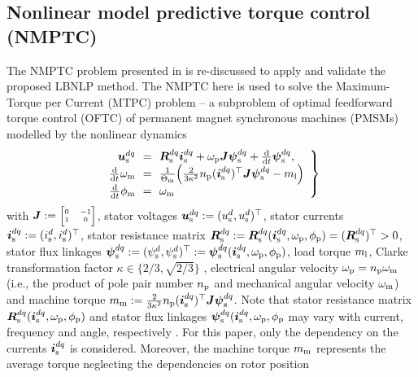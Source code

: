 \documentclass[journal]{IEEEtranTIE}
\begin{document}
\subsection{Nonlinear model predictive torque control (NMPTC)}
\label{subsec:NMPTC}

The NMPTC problem presented in \cite{choi2023model} is re-discussed to apply and validate the proposed LBNLP method. The NMPTC here is used to solve the Maximum-Torque per Current (MTPC) problem -- a subproblem of optimal feedforward torque control (OFTC) \cite{2017_Eldeeb_Aunifiedtheoryforoptimalfeedforwardtorquecontrolofanisotropicsynchronousmachines} of permanent magnet synchronous machines (PMSMs) modelled by the nonlinear dynamics
% 
\begin{equation}
	\left.
	\begin{array}{rcl}
		\usdq &\!\!=\!\!& \Rsdq\isdq + \omegaP\J\psisdq+\ddt\psisdq,  \\
        \ddtsmall \omegaM &\!\!=\!\!& \tfrac{1}{\ThetaM}\Big( \tfrac{2}{3\kappa^2}\nP (\isdq)^\top\J \psisdq - \mL \Big) \\
        \ddtsmall \phiM &\!\!=\!\!& \omegaM
	\end{array}
	\right\}
	\label{eq:transformer-like FLDM}
\end{equation}
% 
with
$\J:={\tiny\begin{bmatrix}
	0 & -1 \\ 1 & 0
\end{bmatrix}}$, 
stator voltages $\boldsymbol{u}_{\mathrm{s}}^{dq}:=(u_{\mathrm{s}}^{d},u_{\mathrm{s}}^{d})^\top$, 
stator currents  $\boldsymbol{i}_{\mathrm{s}}^{dq}:=(i_{\mathrm{s}}^{d},i_{\mathrm{s}}^{d})^\top$,  
stator resistance matrix $\boldsymbol{R}_{\mathrm{s}}^{dq}:=\boldsymbol{R}_{\mathrm{s}}^{dq}(\boldsymbol{i}_{\mathrm{s}}^{dq},\omega_{\mathrm{p}},\phi_{\mathrm{p}}) = (\boldsymbol{R}_{\mathrm{s}}^{dq})^\top >0$,
stator flux linkages $\boldsymbol{\psi}_{\mathrm{s}}^{dq}:=(\psi_{\mathrm{s}}^{d},\psi_{\mathrm{s}}^{d})^\top:=\boldsymbol{\psi}_{\mathrm{s}}^{dq}(\boldsymbol{i}_{\mathrm{s}}^{dq},\omega_{\mathrm{p}},\phi_{\mathrm{p}})$,  
load torque $m_{\mathrm{l}}$,
Clarke transformation factor $\kappa \in \{2/3, \sqrt{2/3}\}$ \cite[Ch.~14]{2017_Hackl_Non-identifierbasedadaptivecontrolinmechatronics:TheoryandApplication},
electrical angular velocity $\omega_{\mathrm{p}} = n_{\mathrm{p}}\omega_{\mathrm{m}}$ (i.e., the product of pole pair number $n_{\mathrm{p}}$ and  mechanical angular velocity $\omega_{\mathrm{m}}$) and machine torque $m_{\mathrm{m}}:=\tfrac{2}{3\kappa^2}n_{\mathrm{p}} (\boldsymbol{i}_{\mathrm{s}}^{dq})^\top\boldsymbol{J} \boldsymbol{\psi}_{\mathrm{s}}^{dq}$.
Note that stator resistance matrix $\boldsymbol{R}_{\mathrm{s}}^{dq}(\boldsymbol{i}_{\mathrm{s}}^{dq},\omega_{\mathrm{p}},\phi_{\mathrm{p}})$ and stator flux linkages $\boldsymbol{\psi}_{\mathrm{s}}^{dq}(\boldsymbol{i}_{\mathrm{s}}^{dq},\omega_{\mathrm{p}},\phi_{\mathrm{p}}$ may vary with current, frequency and angle, respectively \cite{2021_Hackl_GenericLossMinimizationforNonlinearSynchronousMachinesbyAnalyticalComputationofOptimalReferenceCurrentsConsideringCopperandIronLosses}. For this paper, only the dependency on the currents $\boldsymbol{i}_{\mathrm{s}}^{dq}$ is considered. Moreover, the machine torque $m_{\mathrm{m}}$ represents the average torque neglecting the dependencies on rotor position %
\end{document}
